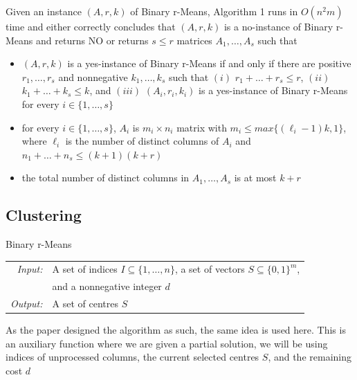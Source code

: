 \documentclass{beamer}
\begin{document}
\begin{frame}
  \begin{theoremlemma}{\cite[Lemma 5]{fomin_golovach_panolan_2020}}
    Given an instance $(A,r,k)$ of Binary r-Means, Algorithm 1 runs in $O(n^2m)$ time
    and either correctly concludes that $(A,r,k)$ is a no-instance of Binary r-Means and
    returns NO or returns $s \leq r$ matrices $A_1, \dots, A_s$ such that

    \begin{itemize}
      \item<2-> $(A,r,k)$ is a yes-instance of Binary r-Means if and only if there are positive
      $r_1,\dots,r_s$ and nonnegative $k_1,\dots,k_s$ such that $(i)$ $r_1 + \dots + r_s \leq r$,
      $(ii)$ $k_1 + \dots + k_s \leq k$, and $(iii)$ $(A_i,r_i,k_i)$ is a yes-instance of Binary
      r-Means for every $i\in\{1,\dots,s\}$
      \item<3-> for every $i\in\{1,\dots,s\}$, $A_i$ is $m_i \times n_i$ matrix with
      $m_i \leq max\{(\ell_i - 1)k, 1\}$, where $\ell_i$ is the number of distinct columns
      of $A_i$ and $n_1 + \dots + n_s \leq (k+1)(k+r)$
      \item<4-> the total number of distinct columns in $A_1,\dots,A_s$ is at most $k+r$
    \end{itemize}
  \end{theoremlemma}
\end{frame}

\subsection{Clustering}
\begin{frame}
  \begin{block}{Binary r-Means}
    \begin{tabular}{r l}
      \textit{Input:}  & A set of indices $I \subseteq \{1,\dots,n\}$, a set of vectors
      $S \subseteq \{0,1\}^m$,                                                          \\
                       & and a nonnegative integer $d$                                  \\
      \textit{Output:} & A set of centres $S$
    \end{tabular}
  \end{block}

  As the paper \cite{fomin_golovach_panolan_2020} designed the algorithm as such, the same idea is
  used here. This is an auxiliary function where we are given a partial solution, we will be
  using indices of unprocessed columns, the current selected centres $S$, and the remaining cost $d$

\end{frame}
\end{document}
